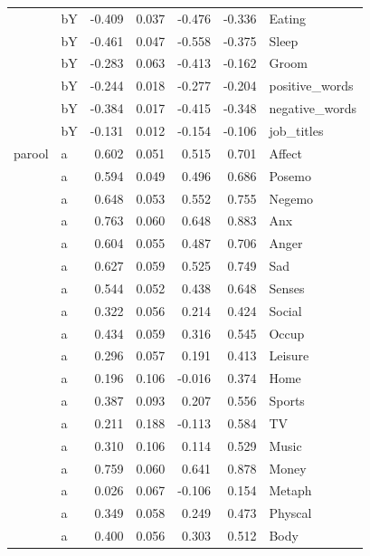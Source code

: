 \documentclass[11pt,a4paper]{article}
\begin{document}
\begin{longtable}{llrrrrl}
   & bY & -0.409 &  0.037 &   -0.476 &    -0.336 &          Eating \\
   & bY & -0.461 &  0.047 &   -0.558 &    -0.375 &           Sleep \\
   & bY & -0.283 &  0.063 &   -0.413 &    -0.162 &           Groom \\
   & bY & -0.244 &  0.018 &   -0.277 &    -0.204 &  positive\_words \\
   & bY & -0.384 &  0.017 &   -0.415 &    -0.348 &  negative\_words \\
   & bY & -0.131 &  0.012 &   -0.154 &    -0.106 &      job\_titles \\
parool & a &  0.602 &  0.051 &    0.515 &     0.701 &          Affect \\
   & a &  0.594 &  0.049 &    0.496 &     0.686 &          Posemo \\
   & a &  0.648 &  0.053 &    0.552 &     0.755 &          Negemo \\
   & a &  0.763 &  0.060 &    0.648 &     0.883 &             Anx \\
   & a &  0.604 &  0.055 &    0.487 &     0.706 &           Anger \\
   & a &  0.627 &  0.059 &    0.525 &     0.749 &             Sad \\
   & a &  0.544 &  0.052 &    0.438 &     0.648 &          Senses \\
   & a &  0.322 &  0.056 &    0.214 &     0.424 &          Social \\
   & a &  0.434 &  0.059 &    0.316 &     0.545 &           Occup \\
   & a &  0.296 &  0.057 &    0.191 &     0.413 &         Leisure \\
   & a &  0.196 &  0.106 &   -0.016 &     0.374 &            Home \\
   & a &  0.387 &  0.093 &    0.207 &     0.556 &          Sports \\
   & a &  0.211 &  0.188 &   -0.113 &     0.584 &              TV \\
   & a &  0.310 &  0.106 &    0.114 &     0.529 &           Music \\
   & a &  0.759 &  0.060 &    0.641 &     0.878 &           Money \\
   & a &  0.026 &  0.067 &   -0.106 &     0.154 &          Metaph \\
   & a &  0.349 &  0.058 &    0.249 &     0.473 &         Physcal \\
   & a &  0.400 &  0.056 &    0.303 &     0.512 &            Body \\

\end{longtable}
\end{document}
